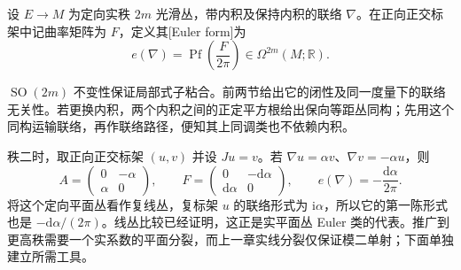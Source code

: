 \begin{definition}\label{g2:def:euler-curvature-form}
	设 \(E\to M\) 为定向实秩 \(2m\) 光滑丛，带内积及保持内积的联络 \(\nabla\)。在正向正交标架中记曲率矩阵为 \(F\)，定义其[Euler form]为
	\begin{equation}\label{g2:eq:euler-pfaffian-form}
		e(\nabla)=\operatorname{Pf}\!\left(\frac{F}{2\pi}\right)\in\Omega^{2m}(M;\mathbb R).
	\end{equation}
\end{definition}

\(\operatorname{SO}(2m)\) 不变性保证局部式子粘合。前两节给出它的闭性及同一度量下的联络无关性。若更换内积，两个内积之间的正定平方根给出保向等距丛同构；先用这个同构运输联络，再作联络路径，便知其上同调类也不依赖内积。

\ProseParagraphBreak

秩二时，取正向正交标架 \((u,v)\) 并设 \(Ju=v\)。若 \(\nabla u=\alpha v\)、\(\nabla v=-\alpha u\)，则
\[
	A=\begin{pmatrix}0&-\alpha\\\alpha&0\end{pmatrix},\qquad
	F=\begin{pmatrix}0&-\mathrm d\alpha\\\mathrm d\alpha&0\end{pmatrix},\qquad
	e(\nabla)=-\frac{\mathrm d\alpha}{2\pi}.
\]
将这个定向平面丛看作复线丛，复标架 \(u\) 的联络形式为 \(\mathrm i\alpha\)，所以它的第一陈形式也是 \(-\mathrm d\alpha/(2\pi)\)。线丛比较已经证明，这正是实平面丛 Euler 类的代表。推广到更高秩需要一个实系数的平面分裂，而上一章实线分裂仅保证模二单射；下面单独建立所需工具。

